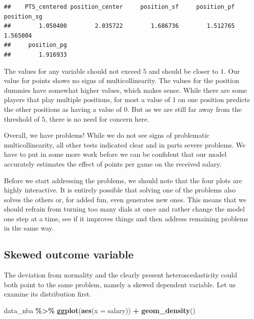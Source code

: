 \documentclass[
]{book}
\newenvironment{Shaded}{\begin{snugshade}}{\end{snugshade}}
\newcommand{\AttributeTok}[1]{\textcolor[rgb]{0.13,0.29,0.53}{#1}}
\newcommand{\FunctionTok}[1]{\textcolor[rgb]{0.13,0.29,0.53}{\textbf{#1}}}
\newcommand{\NormalTok}[1]{#1}
\newcommand{\SpecialCharTok}[1]{\textcolor[rgb]{0.81,0.36,0.00}{\textbf{#1}}}
\begin{document}
\begin{verbatim}
##    PTS_centered position_center     position_sf     position_pf     position_sg 
##        1.050400        2.035722        1.686736        1.512765        1.565004 
##     position_pg 
##        1.916933
\end{verbatim}

The values for any variable should not exceed \(5\) and should be closer to \(1\).
Our value for points shows no signs of multicollinearity. The values for the
position dummies have somewhat higher values, which makes sense. While there are
some players that play multiple positions, for most a value of \(1\) on one
position predicts the other positions as having a value of \(0\). But as we are
still far away from the threshold of \(5\), there is no need for concern here.

Overall, we have problems! While we do not see signs of problematic
multicollinearity, all other tests indicated clear and in parts severe problems.
We have to put in some more work before we can be confident that our model
accurately estimates the effect of points per game on the received salary.

Before we start addressing the problems, we should note that the four plots are
highly interactive. It is entirely possible that solving one of the problems
also solves the others or, for added fun, even generates new ones. This means
that we should refrain from turning too many dials at once and rather change the
model one step at a time, see if it improves things and then address remaining
problems in the same way.

\hypertarget{skewed-outcome-variable}{%
\subsection{Skewed outcome variable}\label{skewed-outcome-variable}}

The deviation from normality and the clearly present heteroscedasticity could
both point to the same problem, namely a skewed dependent variable. Let us
examine its distribution first.

\begin{Shaded}
\begin{Highlighting}[]
\NormalTok{data\_nba }\SpecialCharTok{\%\textgreater{}\%} 
  \FunctionTok{ggplot}\NormalTok{(}\FunctionTok{aes}\NormalTok{(}\AttributeTok{x =}\NormalTok{ salary)) }\SpecialCharTok{+}
  \FunctionTok{geom\_density}\NormalTok{()}
\end{Highlighting}
\end{Shaded}
\end{document}
